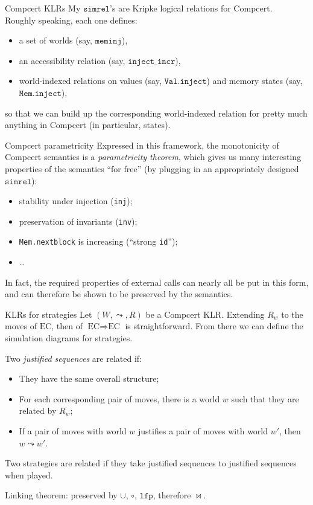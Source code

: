\documentclass[handout]{beamer}
\newcommand{\EC}{\text{EC}}
\newcommand{\ECEC}{\EC \Rightarrow \EC}
\newcommand{\kw}[1]{\texttt{#1}}
\begin{document}
\begin{frame}{Compcert KLRs} %
My $\kw{simrel}$'s are Kripke logical relations for Compcert. \\
Roughly speaking, each one defines:
\begin{itemize}
\item a set of worlds (say, $\kw{meminj}$),
\item an accessibility relation (say, $\kw{inject\_incr}$),
\item world-indexed relations on values (say, $\kw{Val.inject}$)
  and memory states (say, $\kw{Mem.inject}$),
\end{itemize}
so that we can build up the corresponding world-indexed relation
for pretty much anything in Compcert
(in particular, states).
\end{frame}

\begin{frame}{Compcert parametricity} %
Expressed in this framework,
the monotonicity of Compcert semantics
is a \emph{parametricity theorem},
which gives us many interesting properties of the semantics
``for free''
(by plugging in an appropriately designed $\kw{simrel}$):
\begin{itemize}
\item stability under injection (\kw{inj});
\item preservation of invariants (\kw{inv});
\item \kw{Mem.nextblock} is increasing (``strong \kw{id}'');
\item \ldots
\end{itemize}

In fact,
the required properties of external calls
can nearly all be put in this form,
and can therefore be shown to be preserved by the semantics.
\end{frame}

\begin{frame}{KLRs for strategies} %
Let $(W, \leadsto, R)$ be a Compcert KLR.
Extending $R_w$ to the moves of $\EC$,
then of $\ECEC$ is straightforward.
From there we can define the simulation diagrams
for strategies.

Two \emph{justified sequences} are related if:
\begin{itemize}
\item They have the same overall structure;
\item For each corresponding pair of moves,
  there is a world $w$ such that they are related by $R_w$;
\item If a pair of moves with world $w$ justifies
  a pair of moves with world $w'$,
  then $w \leadsto w'$.
\end{itemize}

Two strategies are related if they take justified sequences
to justified sequences when played.

Linking theorem: preserved by
$\cup$, $\circ$, $\kw{lfp}$, therefore $\bowtie$.
\end{frame}
\end{document}
